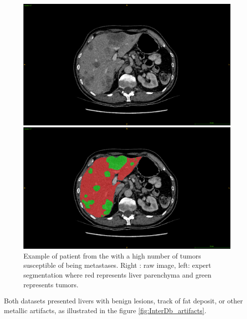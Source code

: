 {\begin{figure}[!ht]
	\begin{mdframed}[backgroundcolor=blue!50,linecolor=blue!50]
		\centering
		\begin{minipage}{6cm}
			\includegraphics[width=\linewidth]{images/LITS_examplePatientMeta}
		\end{minipage} \hspace{-0.1cm}
		\begin{minipage}{6cm}
			\includegraphics[width=\linewidth]{images/LITS_examplePatientMeta_seg}
		\end{minipage}
	\end{mdframed}
	\caption{Example of patient from the \textbf{} with a high number of tumors susceptible of being metastases. Right : raw image, left: expert segmentation where red represents liver parenchyma and green represents tumors.}
	\label{fig:litsDb_meta}
\end{figure}
Both datasets presented livers with benign lesions, track of fat deposit, or other metallic artifacts, as illustrated in the figure \ref{fig:InterDb_artifacts}.
\begin{figure}[!ht]

\end{figure}}
